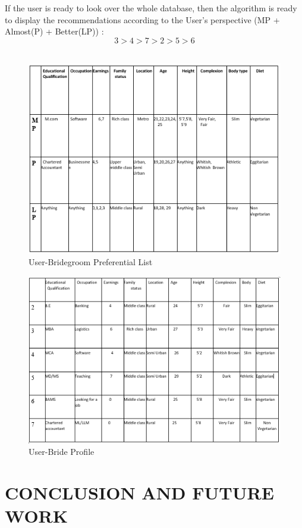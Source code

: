 \documentclass[12pt,oneside]{book}
\begin{document}
If the user is ready to look over the whole database, then the algorithm is ready to display the recommendations according to the User’s perspective (MP + Almost(P) + Better(LP)) :
\[3 > 4 > 7 > 2 > 5 > 6\]\\
\begin{figure}[h]
    \centering
    \includegraphics[width=1.0\textwidth]{table1}
    \caption{User-Bridegroom Preferential List}
    \label{fig:table1}
\end{figure}
\begin{figure}[h!]
    \centering
    \includegraphics[width=1.2\textwidth]{table2}
    \caption{User-Bride Profile}
    \label{fig:table2}
\end{figure}

\newpage
\chapter{CONCLUSION AND FUTURE WORK}
\end{document}
